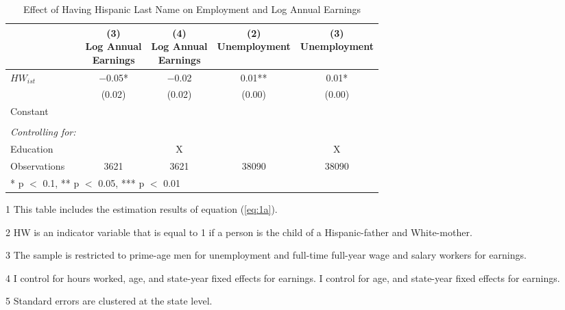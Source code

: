 \begin{table}[H]
\centering
\caption{Effect of Having Hispanic Last Name on Employment and Log Annual Earnings}
\label{tab:lastnamereg}
\begin{threeparttable}
\begin{tabular}{lcccc}
\toprule
  & \specialcell{(3) \\ Log Annual \\ Earnings} & \specialcell{(4) \\ Log Annual \\ Earnings} & \specialcell{(2) \\ Unemployment} & \specialcell{(3) \\ Unemployment} \\
\midrule
$HW_{ist}$ & \num{-0.05}* & \num{-0.02} & \num{0.01}** & \num{0.01}* \\
 & (\num{0.02}) & (\num{0.02}) & (\num{0.00}) & (\num{0.00}) \\
Constant &  &  &  & \\
 &  &  &  & \\
\midrule
\textit{Controlling for:} & & & & \\
Education &  & X &  & X \\
Observations & \num{3621} & \num{3621} & \num{38090} & \num{38090} \\
\bottomrule
\multicolumn{5}{l}{\rule{0pt}{1em}* p $<$ 0.1, ** p $<$ 0.05, *** p $<$ 0.01}\\
\end{tabular}
\begin{tablenotes}
\item[1] {\footnotesize{This table includes the estimation results of equation (\ref{eq:1a}).}}
\item[2] {\footnotesize{HW is an indicator variable that is equal to 1 if a person is the child of a Hispanic-father and White-mother.}}
\item[3] {\footnotesize{The sample is restricted to prime-age men for unemployment and full-time full-year wage and salary workers for earnings.}}
\item[4] {\footnotesize{I control for hours worked, age, and state-year fixed effects for earnings. I control for age, and state-year fixed effects for earnings.}}

\item[5] {\footnotesize{Standard errors are clustered at the state level.}}
\end{tablenotes}
\end{threeparttable}
\end{table}
